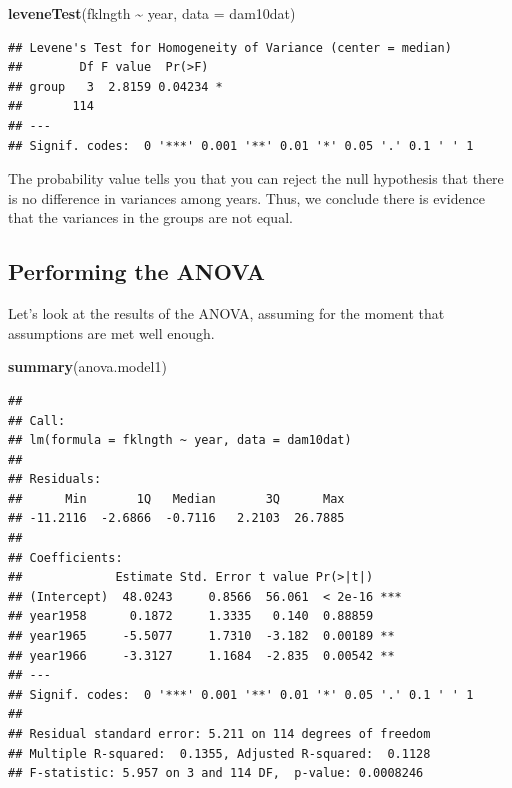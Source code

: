\documentclass[
  12pt,
]{book}
\newenvironment{Shaded}{\begin{snugshade}}{\end{snugshade}}
\newcommand{\DataTypeTok}[1]{\textcolor[rgb]{0.13,0.29,0.53}{#1}}
\newcommand{\KeywordTok}[1]{\textcolor[rgb]{0.13,0.29,0.53}{\textbf{#1}}}
\newcommand{\NormalTok}[1]{#1}
\newcommand{\OperatorTok}[1]{\textcolor[rgb]{0.81,0.36,0.00}{\textbf{#1}}}
\newcommand{\StringTok}[1]{\textcolor[rgb]{0.31,0.60,0.02}{#1}}
\begin{document}
\begin{Shaded}
\begin{Highlighting}[]
\KeywordTok{leveneTest}\NormalTok{(fklngth }\OperatorTok{\textasciitilde{}}\StringTok{ }\NormalTok{year, }\DataTypeTok{data =}\NormalTok{ dam10dat)}
\end{Highlighting}
\end{Shaded}

\begin{verbatim}
## Levene's Test for Homogeneity of Variance (center = median)
##        Df F value  Pr(>F)  
## group   3  2.8159 0.04234 *
##       114                  
## ---
## Signif. codes:  0 '***' 0.001 '**' 0.01 '*' 0.05 '.' 0.1 ' ' 1
\end{verbatim}

The probability value tells you that you can reject the null hypothesis that there is no difference in variances among years. Thus, we conclude there is evidence that the variances in the groups are not equal.

\hypertarget{performing-the-anova}{%
\subsection{Performing the ANOVA}\label{performing-the-anova}}

Let's look at the results of the ANOVA, assuming for the moment that assumptions are met well enough.

\begin{Shaded}
\begin{Highlighting}[]
\KeywordTok{summary}\NormalTok{(anova.model1)}
\end{Highlighting}
\end{Shaded}

\begin{verbatim}
## 
## Call:
## lm(formula = fklngth ~ year, data = dam10dat)
## 
## Residuals:
##      Min       1Q   Median       3Q      Max 
## -11.2116  -2.6866  -0.7116   2.2103  26.7885 
## 
## Coefficients:
##             Estimate Std. Error t value Pr(>|t|)    
## (Intercept)  48.0243     0.8566  56.061  < 2e-16 ***
## year1958      0.1872     1.3335   0.140  0.88859    
## year1965     -5.5077     1.7310  -3.182  0.00189 ** 
## year1966     -3.3127     1.1684  -2.835  0.00542 ** 
## ---
## Signif. codes:  0 '***' 0.001 '**' 0.01 '*' 0.05 '.' 0.1 ' ' 1
## 
## Residual standard error: 5.211 on 114 degrees of freedom
## Multiple R-squared:  0.1355, Adjusted R-squared:  0.1128 
## F-statistic: 5.957 on 3 and 114 DF,  p-value: 0.0008246
\end{verbatim}
\end{document}
